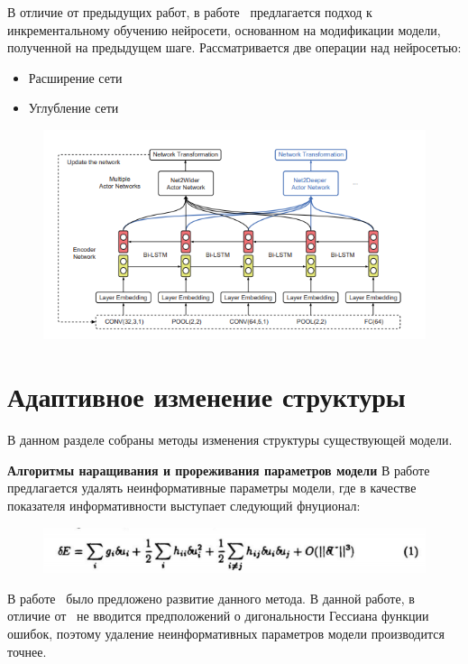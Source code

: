 В отличие от предыдущих работ, в работе~\cite{reinf_deep2net} предлагается подход к инкрементальному обучению нейросети, основанном на модификации модели, полученной на предыдущем шаге. Рассматривается две операции над нейросетью:
\begin{itemize}
\item Расширение сети
\item Углубление сети
\end{itemize}

\begin{figure}[H]
\includegraphics[width=\textwidth]{./plots/arch_review_figs/deep2net.png}
\end{figure}



\section{Адаптивное изменение структуры}
В данном разделе собраны методы изменения структуры существующей модели. 

\textbf{Алгоритмы наращивания и прореживания параметров модели}
В работе~\cite{obd} предлагается удалять неинформативные параметры модели, где в качестве показателя информативности выступает следующий фнуционал: 
\begin{figure}[H]
\includegraphics[width=\textwidth]{./plots/arch_review_figs/obd.png}
\end{figure}
В работе~\cite{obs} было предложено развитие данного метода. В данной работе, в отличие от~\cite{obd} не вводится предположений о дигональности Гессиана функции ошибок, поэтому удаление неинформативных параметров модели производится точнее.

